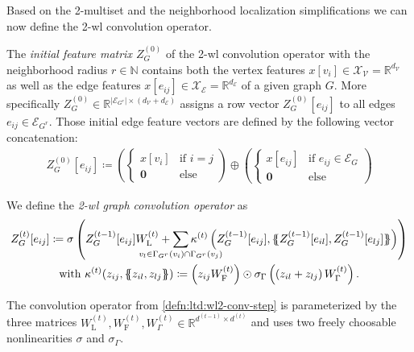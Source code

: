 Based on the 2-multiset and the neighborhood localization simplifications we can now define the 2-\ac{wl} convolution operator.
\begin{defn}\label{defn:ltd:wl2-conv-init}
	The \textit{initial feature matrix $Z_G^{(0)}$} of the 2-\acs{wl} convolution operator with the neighborhood radius $r \in \mathbb{N}$ contains both the vertex features $x[v_i] \in \mathcal{X}_{\mathcal{V}} = \mathbb{R}^{d_{\mathcal{V}}}$ as well as the edge features $x[e_{ij}] \in \mathcal{X}_{\mathcal{E}} = \mathbb{R}^{d_{\mathcal{E}}}$ of a given graph $G$.
	More specifically $Z_G^{(0)} \in \mathbb{R}^{{|\mathcal{E}_{G^r}|} \times (d_{\mathcal{V}} + d_{\mathcal{E}})}$ assigns a row vector $Z_G^{(0)}[e_{ij}]$ to all edges $e_{ij} \in \mathcal{E}_{G^r}$.
	Those initial edge feature vectors are defined by the following vector concatenation:
	\begin{align*}
		Z_G^{(0)}[e_{ij}] \coloneqq \left( \begin{cases}
			x[v_i] & \text{if $i = j$} \\
			\mathbf{0} & \text{else}
		\end{cases} \right) \oplus \left( \begin{cases}
			x[e_{ij}] & \text{if $e_{ij} \in \mathcal{E}_G$} \\
			\mathbf{0} & \text{else}
		\end{cases} \right)
	\end{align*}
\end{defn}
\begin{defn}\label{defn:ltd:wl2-conv-step}
	We define the \textit{2-\acs{wl} graph convolution operator} as
	\begin{gather*}
		Z_G^{(t)}[e_{ij}] \coloneqq \sigma\left( Z_G^{(t-1)}[e_{ij}] W_{\mathrm{L}}^{(t)} + \smashoperator[lr]{\sum_{v_l \in {\Gamma_{G^r}(v_i) \cap \Gamma_{G^r}(v_j)}}} \kappa^{(t)}\left( Z_G^{(t-1)}[e_{ij}], \ldblbrace Z_G^{(t-1)}[e_{il}], Z_G^{(t-1)}[e_{lj}] \rdblbrace \right) \right) \\
		\text{with } \kappa^{(t)}(z_{ij}, \ldblbrace z_{il}, z_{lj} \rdblbrace) \coloneqq \left( z_{ij} W_{\mathrm{F}}^{(t)} \right) \odot \sigma_{\Gamma}\left(\left( z_{il} + z_{lj} \right) W_{\Gamma}^{(t)} \right)
		\text{.}
	\end{gather*}
\end{defn}
The convolution operator from \cref{defn:ltd:wl2-conv-step} is parameterized by the three matrices $W_{\mathrm{L}}^{(t)}, W_{\mathrm{F}}^{(t)},  W_{\Gamma}^{(t)} \in \mathbb{R}^{d^{(t-1)} \times d^{(t)}}$ and uses two freely choosable nonlinearities $\sigma$ and $\sigma_{\Gamma}$.

